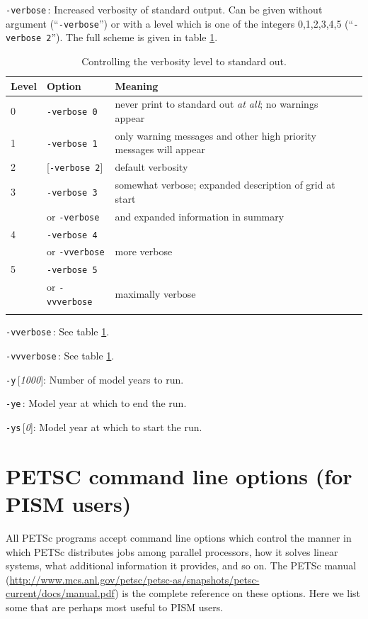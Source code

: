 \documentclass[11pt,final]{amsart}
\renewcommand{\t}[1]{\texttt{#1}}
\newcommand{\rawopt}[1]{\vspace{1mm}\noindent \Large\texttt{-#1}\normalsize}
\newcommand{\opt}[1]{\rawopt{#1}\,:\quad}
\newcommand{\optdef}[2]{\rawopt{#1}\,[\textsl{#2}]:\quad}
\begin{document}
\opt{verbose}   Increased verbosity of standard output.  Can be given without argument (``\verb|-verbose|'') or with a level which is one of the integers 0,1,2,3,4,5 (``\verb|-verbose 2|'').  The full scheme is given in table \ref{tab:verbosity}.

\begin{table}[h]
\caption{Controlling the verbosity level to standard out.}\label{tab:verbosity}
\begin{tabular}{@{}llll}\hline
\textbf{Level} & \textbf{Option} & \textbf{Meaning} \\ \hline
   0  &  \t{-verbose 0} &   never print to standard out \emph{at all}; no warnings appear  \\
   1  &  \t{-verbose 1} &   only warning messages and other high priority messages will appear  \\
   2  &  [\t{-verbose 2}] & default verbosity    \\
   3  &  \t{-verbose 3} &   somewhat verbose; expanded description of grid at start  \\
      &  or \quad \t{-verbose} &  and expanded information in summary    \\
   4  &  \t{-verbose 4} &     \\
      &  or \quad \t{-vverbose} &  more verbose    \\
   5  &  \t{-verbose 5} &     \\
      &  or \quad \t{-vvverbose} &  maximally verbose \\
\hline
\normalsize
\end{tabular}
\end{table}

\opt{vverbose}   See table \ref{tab:verbosity}.

\opt{vvverbose}   See table \ref{tab:verbosity}.

\optdef{y}{1000} Number of model years to run.

\opt{ye} Model year at which to end the run.

\optdef{ys}{0} Model year at which to start the run.


\clearpage\newpage
\section{PETSC command line options (for PISM users)}  All PETSc programs accept command line options which control the manner in which PETSc distributes jobs among parallel processors, how it solves linear systems, what additional information it provides, and so on.  The PETSc manual (\url{http://www.mcs.anl.gov/petsc/petsc-as/snapshots/petsc-current/docs/manual.pdf}) is the complete reference on these options.  Here we list some that are perhaps most useful to PISM users.
\end{document}
